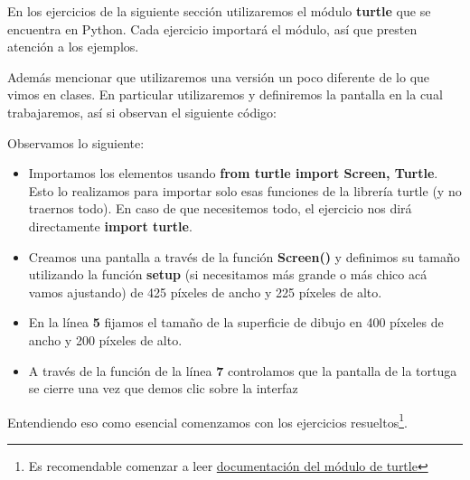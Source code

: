 En los ejercicios de la siguiente sección utilizaremos el módulo \textbf{turtle} que se encuentra en Python. Cada ejercicio importará el módulo, así que presten atención a los ejemplos.

Además mencionar que utilizaremos una versión un poco diferente de lo que vimos en clases. En particular utilizaremos y definiremos la pantalla en la cual trabajaremos, así si observan el siguiente código:\\

\begin{listing}[H]
\end{listing}

Observamos lo siguiente:

\begin{itemize}
    \item Importamos los elementos usando \textbf{from turtle import Screen, Turtle}. Esto lo realizamos para importar solo esas funciones de la librería turtle (y no traernos todo). En caso de que necesitemos todo, el ejercicio nos dirá directamente \textbf{import turtle}.
    \item Creamos una pantalla a través de la función \textbf{Screen()} y definimos su tamaño utilizando la función \textbf{setup} (si necesitamos más grande o más chico acá vamos ajustando) de 425 píxeles de ancho y 225 píxeles de alto.
    \item En la línea \textbf{5} fijamos el tamaño de la superficie de dibujo en 400 píxeles de ancho y 200 píxeles de alto.
    \item A través de la función de la línea \textbf{7} controlamos que la pantalla de la tortuga se cierre una vez que demos clic sobre la interfaz
\end{itemize}

Entendiendo eso como esencial comenzamos con los ejercicios resueltos\footnote{Es recomendable comenzar a leer \href{https://docs.python.org/3/library/turtle.html}{documentación del módulo de turtle}}.

